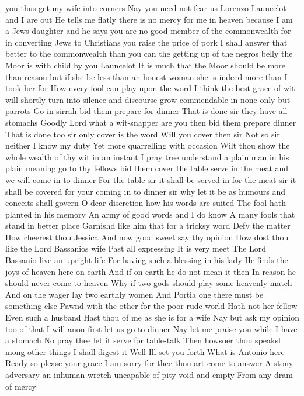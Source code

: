 you thus get my wife into corners
Nay you need not fear us Lorenzo Launcelot and I
are out He tells me flatly there is no mercy for
me in heaven because I am a Jews daughter and he
says you are no good member of the commonwealth
for in converting Jews to Christians you raise the
price of pork
I shall answer that better to the commonwealth than
you can the getting up of the negros belly the
Moor is with child by you Launcelot
It is much that the Moor should be more than reason
but if she be less than an honest woman she is
indeed more than I took her for
How every fool can play upon the word I think the
best grace of wit will shortly turn into silence
and discourse grow commendable in none only but
parrots Go in sirrah bid them prepare for dinner
That is done sir they have all stomachs
Goodly Lord what a wit-snapper are you then bid
them prepare dinner
That is done too sir only cover is the word
Will you cover then sir
Not so sir neither I know my duty
Yet more quarrelling with occasion Wilt thou show
the whole wealth of thy wit in an instant I pray
tree understand a plain man in his plain meaning
go to thy fellows bid them cover the table serve
in the meat and we will come in to dinner
For the table sir it shall be served in for the
meat sir it shall be covered for your coming in
to dinner sir why let it be as humours and
conceits shall govern
O dear discretion how his words are suited
The fool hath planted in his memory
An army of good words and I do know
A many fools that stand in better place
Garnishd like him that for a tricksy word
Defy the matter How cheerest thou Jessica
And now good sweet say thy opinion
How dost thou like the Lord Bassanios wife
Past all expressing It is very meet
The Lord Bassanio live an upright life
For having such a blessing in his lady
He finds the joys of heaven here on earth
And if on earth he do not mean it then
In reason he should never come to heaven
Why if two gods should play some heavenly match
And on the wager lay two earthly women
And Portia one there must be something else
Pawnd with the other for the poor rude world
Hath not her fellow
Even such a husband
Hast thou of me as she is for a wife
Nay but ask my opinion too of that
I will anon first let us go to dinner
Nay let me praise you while I have a stomach
No pray thee let it serve for table-talk
 Then howsoer thou speakst mong other things
I shall digest it
Well Ill set you forth
What is Antonio here
Ready so please your grace
I am sorry for thee thou art come to answer
A stony adversary an inhuman wretch
uncapable of pity void and empty
From any dram of mercy
